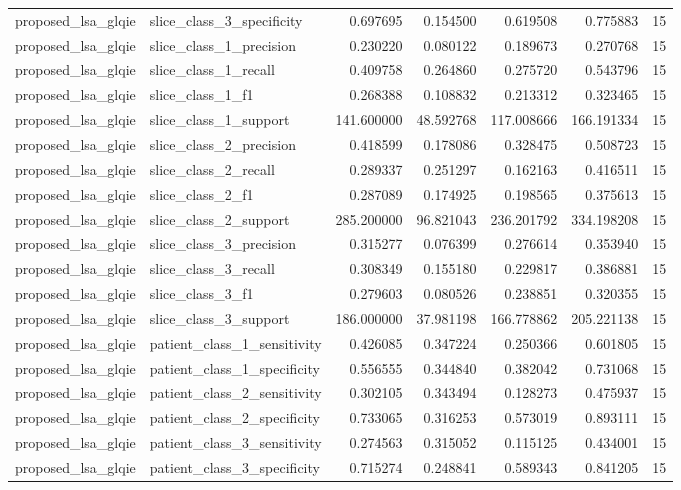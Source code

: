 \begin{tabular}{llrrrrr}
proposed_lsa_glqie & slice_class_3_specificity & 0.697695 & 0.154500 & 0.619508 & 0.775883 & 15 \\
proposed_lsa_glqie & slice_class_1_precision & 0.230220 & 0.080122 & 0.189673 & 0.270768 & 15 \\
proposed_lsa_glqie & slice_class_1_recall & 0.409758 & 0.264860 & 0.275720 & 0.543796 & 15 \\
proposed_lsa_glqie & slice_class_1_f1 & 0.268388 & 0.108832 & 0.213312 & 0.323465 & 15 \\
proposed_lsa_glqie & slice_class_1_support & 141.600000 & 48.592768 & 117.008666 & 166.191334 & 15 \\
proposed_lsa_glqie & slice_class_2_precision & 0.418599 & 0.178086 & 0.328475 & 0.508723 & 15 \\
proposed_lsa_glqie & slice_class_2_recall & 0.289337 & 0.251297 & 0.162163 & 0.416511 & 15 \\
proposed_lsa_glqie & slice_class_2_f1 & 0.287089 & 0.174925 & 0.198565 & 0.375613 & 15 \\
proposed_lsa_glqie & slice_class_2_support & 285.200000 & 96.821043 & 236.201792 & 334.198208 & 15 \\
proposed_lsa_glqie & slice_class_3_precision & 0.315277 & 0.076399 & 0.276614 & 0.353940 & 15 \\
proposed_lsa_glqie & slice_class_3_recall & 0.308349 & 0.155180 & 0.229817 & 0.386881 & 15 \\
proposed_lsa_glqie & slice_class_3_f1 & 0.279603 & 0.080526 & 0.238851 & 0.320355 & 15 \\
proposed_lsa_glqie & slice_class_3_support & 186.000000 & 37.981198 & 166.778862 & 205.221138 & 15 \\
proposed_lsa_glqie & patient_class_1_sensitivity & 0.426085 & 0.347224 & 0.250366 & 0.601805 & 15 \\
proposed_lsa_glqie & patient_class_1_specificity & 0.556555 & 0.344840 & 0.382042 & 0.731068 & 15 \\
proposed_lsa_glqie & patient_class_2_sensitivity & 0.302105 & 0.343494 & 0.128273 & 0.475937 & 15 \\
proposed_lsa_glqie & patient_class_2_specificity & 0.733065 & 0.316253 & 0.573019 & 0.893111 & 15 \\
proposed_lsa_glqie & patient_class_3_sensitivity & 0.274563 & 0.315052 & 0.115125 & 0.434001 & 15 \\
proposed_lsa_glqie & patient_class_3_specificity & 0.715274 & 0.248841 & 0.589343 & 0.841205 & 15 \\

\end{tabular}
